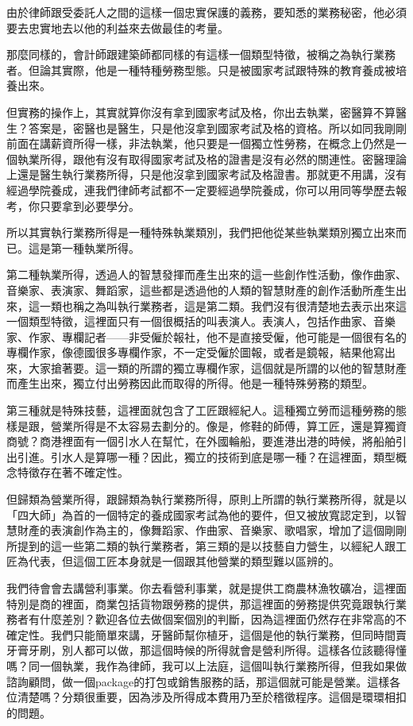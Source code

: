 \documentclass[]{ctexbook}
\begin{document}
由於律師跟受委託人之間的這樣一個忠實保護的義務，要知悉的業務秘密，他必須要去忠實地去以他的利益來去做最佳的考量。

那麼同樣的，會計師跟建築師都同樣的有這樣一個類型特徵，被稱之為執行業務者。但論其實際，他是一種特種勞務型態。只是被國家考試跟特殊的教育養成被培養出來。

但實務的操作上，其實就算你沒有拿到國家考試及格，你出去執業，密醫算不算醫生？答案是，密醫也是醫生，只是他沒拿到國家考試及格的資格。所以如同我剛剛前面在講薪資所得一樣，非法執業，他只要是一個獨立性勞務，在概念上仍然是一個執業所得，跟他有沒有取得國家考試及格的證書是沒有必然的關連性。密醫理論上還是醫生執行業務所得，只是他沒拿到國家考試及格證書。那就更不用講，沒有經過學院養成，連我們律師考試都不一定要經過學院養成，你可以用同等學歷去報考，你只要拿到必要學分。

所以其實執行業務所得是一種特殊執業類別，我們把他從某些執業類別獨立出來而已。這是第一種執業所得。

第二種執業所得，透過人的智慧發揮而產生出來的這一些創作性活動，像作曲家、音樂家、表演家、舞蹈家，這些都是透過他的人類的智慧財產的創作活動所產生出來，這一類也稱之為叫執行業務者，這是第二類。我們沒有很清楚地去表示出來這一個類型特徵，這裡面只有一個很概括的叫表演人。表演人，包括作曲家、音樂家、作家、專欄記者------非受僱於報社，他不是直接受僱，他可能是一個很有名的專欄作家，像德國很多專欄作家，不一定受僱於圖報，或者是鏡報，結果他寫出來，大家搶著要。這一類的所謂的獨立專欄作家，這個就是所謂的以他的智慧財產而產生出來，獨立付出勞務因此而取得的所得。他是一種特殊勞務的類型。

第三種就是特殊技藝，這裡面就包含了工匠跟經紀人。這種獨立勞而這種勞務的態樣是跟，營業所得是不太容易去劃分的。像是，修鞋的師傅，算工匠，還是算獨資商號？商港裡面有一個引水人在幫忙，在外國輪船，要進港出港的時候，將船舶引出引進。引水人是算哪一種？因此，獨立的技術到底是哪一種？在這裡面，類型概念特徵存在著不確定性。

但歸類為營業所得，跟歸類為執行業務所得，原則上所謂的執行業務所得，就是以「四大師」為首的一個特定的養成國家考試為他的要件，但又被放寬認定到，以智慧財產的表演創作為主的，像舞蹈家、作曲家、音樂家、歌唱家，增加了這個剛剛所提到的這一些第二類的執行業務者，第三類的是以技藝自力營生，以經紀人跟工匠為代表，但這個工匠本身就是一個跟其他營業的類型難以區辨的。

我們待會會去講營利事業。你去看營利事業，就是提供工商農林漁牧礦冶，這裡面特別是商的裡面，商業包括貨物跟勞務的提供，那這裡面的勞務提供究竟跟執行業務者有什麼差別？歡迎各位去做個案個別的判斷，因為這裡面仍然存在非常高的不確定性。我們只能簡單來講，牙醫師幫你植牙，這個是他的執行業務，但同時間賣牙膏牙刷，別人都可以做，那這個時候的所得就會是營利所得。這樣各位該聽得懂嗎？同一個執業，我作為律師，我可以上法庭，這個叫執行業務所得，但我如果做諮詢顧問，做一個package的打包或銷售服務的話，那這個就可能是營業。這樣各位清楚嗎？分類很重要，因為涉及所得成本費用乃至於稽徵程序。這個是環環相扣的問題。
\end{document}
